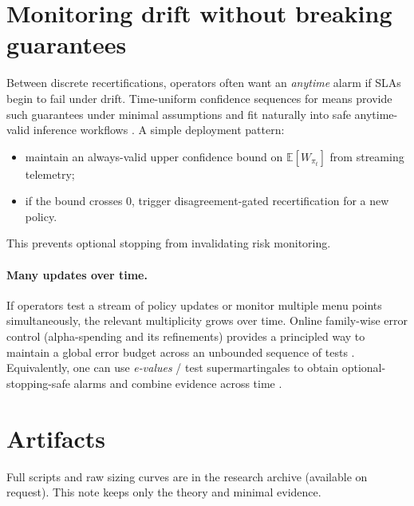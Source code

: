 \documentclass[11pt]{article}
\begin{document}
\section{Monitoring drift without breaking guarantees}

Between discrete recertifications, operators often want an \emph{anytime} alarm if SLAs begin to fail under drift.
Time-uniform confidence sequences for means provide such guarantees under minimal assumptions \cite{howard2021} and fit naturally into safe anytime-valid inference workflows \cite{ramdas2023savi}.
A simple deployment pattern:
\begin{itemize}
  \item maintain an always-valid upper confidence bound on $\mathbb{E}[W_{\pi_t}]$ from streaming telemetry;
  \item if the bound crosses $0$, trigger disagreement-gated recertification for a new policy.
\end{itemize}
This prevents optional stopping from invalidating risk monitoring.

\paragraph{Many updates over time.}
If operators test a stream of policy updates or monitor multiple menu points simultaneously, the relevant multiplicity grows over time.
Online family-wise error control (alpha-spending and its refinements) provides a principled way to maintain a global error budget across an unbounded sequence of tests \cite{tian2021onlinefwer}.
Equivalently, one can use \emph{e-values} / test supermartingales to obtain optional-stopping-safe alarms and combine evidence across time \cite{ramdas2025evals,vovk2021evals,hartog2025efwer}.


\section*{Artifacts}
Full scripts and raw sizing curves are in the research archive (available on request). This note keeps only the theory and minimal evidence.
\end{document}
